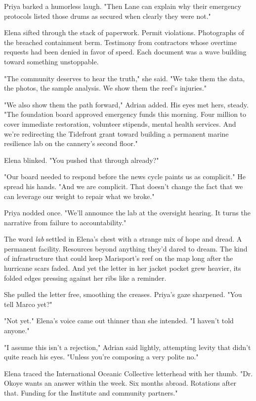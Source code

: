 Priya barked a humorless laugh. "Then Lane can explain why their emergency protocols listed those drums as secured when clearly they were not."

Elena sifted through the stack of paperwork. Permit violations. Photographs of the breached containment berm. Testimony from contractors whose overtime requests had been denied in favor of speed. Each document was a wave building toward something unstoppable.

"The community deserves to hear the truth," she said. "We take them the data, the photos, the sample analysis. We show them the reef's injuries."

"We also show them the path forward," Adrian added. His eyes met hers, steady. "The foundation board approved emergency funds this morning. Four million to cover immediate restoration, volunteer stipends, mental health services. And we're redirecting the Tidefront grant toward building a permanent marine resilience lab on the cannery's second floor."

Elena blinked. "You pushed that through already?"

"Our board needed to respond before the news cycle paints us as complicit." He spread his hands. "And we are complicit. That doesn't change the fact that we can leverage our weight to repair what we broke."

Priya nodded once. "We'll announce the lab at the oversight hearing. It turns the narrative from failure to accountability."

The word \textit{lab} settled in Elena's chest with a strange mix of hope and dread. A permanent facility. Resources beyond anything they'd dared to dream. The kind of infrastructure that could keep Marisport's reef on the map long after the hurricane scars faded. And yet the letter in her jacket pocket grew heavier, its folded edges pressing against her ribs like a reminder.

She pulled the letter free, smoothing the creases. Priya's gaze sharpened. "You tell Marco yet?"

"Not yet." Elena's voice came out thinner than she intended. "I haven't told anyone."

"I assume this isn't a rejection," Adrian said lightly, attempting levity that didn't quite reach his eyes. "Unless you're composing a very polite no."

Elena traced the International Oceanic Collective letterhead with her thumb. "Dr. Okoye wants an answer within the week. Six months abroad. Rotations after that. Funding for the Institute and community partners."

